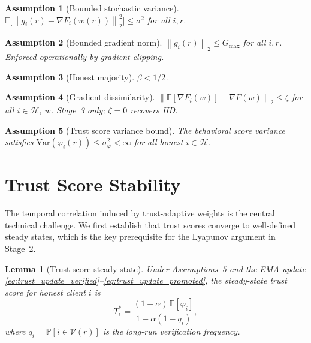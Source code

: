 \documentclass{article}
\newtheorem{lemma}[theorem]{Lemma}
\newtheorem{assumption}{Assumption}
\newcommand{\E}{\mathbb{E}}
\renewcommand{\Pr}{\mathbb{P}}
\newcommand{\norm}[1]{\left\lVert #1 \right\rVert}
\newcommand{\calH}{\mathcal{H}}
\newcommand{\calV}{\mathcal{V}}
\newcommand{\gF}{\nabla F}
\begin{document}
\begin{assumption}[Bounded stochastic variance]
\label{assump:var}
$\E\bigl[\norm{g_i(r) - \gF_i(w(r))}_2^2\bigr] \leq \sigma^2$ for all $i,r$.
\end{assumption}

\begin{assumption}[Bounded gradient norm]
\label{assump:gnorm}
$\norm{g_i(r)}_2 \leq G_{\max}$ for all $i,r$.
Enforced operationally by gradient clipping.
\end{assumption}

\begin{assumption}[Honest majority]
\label{assump:majority}
$\beta < 1/2$.
\end{assumption}

\begin{assumption}[Gradient dissimilarity]
\label{assump:dissim}
$\norm{\E[\gF_i(w)] - \gF(w)}_2 \leq \zeta$ for all $i \in \calH$, $w$.
Stage~3 only; $\zeta = 0$ recovers IID.
\end{assumption}

\begin{assumption}[Trust score variance bound]
\label{assump:trust_var}
The behavioral score variance satisfies
$\mathrm{Var}(\varphi_i(r)) \leq \sigma_\varphi^2 < \infty$
for all honest $i \in \calH$.
\end{assumption}

\section{Trust Score Stability}
\label{sec:trust_stability}

The temporal correlation induced by trust-adaptive weights is the central
technical challenge.
We first establish that trust scores converge to well-defined steady states,
which is the key prerequisite for the Lyapunov argument in Stage~2.

\begin{lemma}[Trust score steady state]
\label{lem:trust_steady}
Under Assumptions~\ref{assump:trust_var} and the EMA update
\eqref{eq:trust_update_verified}--\eqref{eq:trust_update_promoted}, the
steady-state trust score for honest client $i$ is
\[
  T_i^* = \frac{(1-\alpha)\,\E[\varphi_i]}{1 - \alpha(1-q_i)},
\]
where $q_i = \Pr[i \in \calV(r)]$ is the long-run verification frequency.
\end{lemma}
\end{document}
